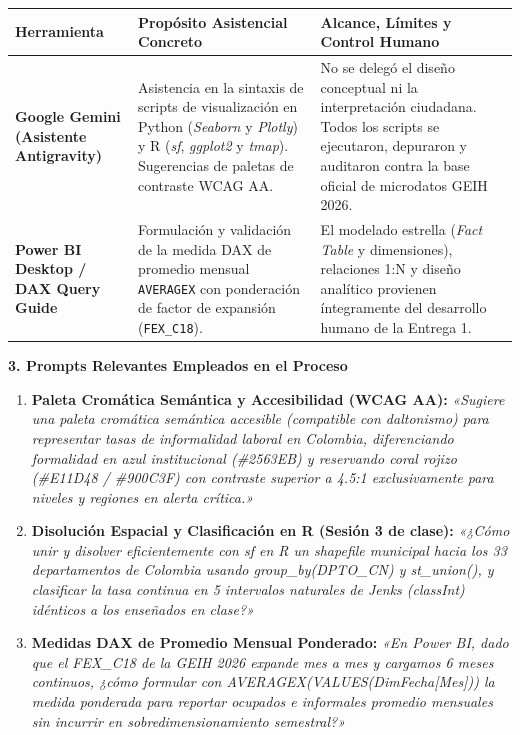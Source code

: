 \documentclass[10pt,letterpaper]{article}
\begin{document}
\bgroup
\def\arraystretch{1.15}
\fontsize{8pt}{10pt}\selectfont
\begin{tabularx}{\textwidth}{>{\bfseries\color{navy}}p{3.2cm} X X}
\toprule
\rowcolor{accentbg}
\textbf{Herramienta} & \textbf{Propósito Asistencial Concreto} & \textbf{Alcance, Límites y Control Humano} \\
\midrule
Google Gemini \newline (Asistente Antigravity) & 
Asistencia en la sintaxis de scripts de visualización en Python (\textit{Seaborn} y \textit{Plotly}) y R (\textit{sf}, \textit{ggplot2} y \textit{tmap}). Sugerencias de paletas de contraste WCAG AA. & 
No se delegó el diseño conceptual ni la interpretación ciudadana. Todos los scripts se ejecutaron, depuraron y auditaron contra la base oficial de microdatos GEIH 2026. \\
\midrule
Power BI Desktop / \newline DAX Query Guide & 
Formulación y validación de la medida DAX de promedio mensual \texttt{AVERAGEX} con ponderación de factor de expansión (\texttt{FEX\_C18}). & 
El modelado estrella (\textit{Fact Table} y dimensiones), relaciones 1:N y diseño analítico provienen íntegramente del desarrollo humano de la Entrega 1. \\
\bottomrule
\end{tabularx}
\egroup

\vspace{3pt}

{\color{navy}\fontsize{10pt}{12pt}\selectfont \textbf{3. Prompts Relevantes Empleados en el Proceso}}
\vspace{1pt}

\begin{enumerate}[label=\textbf{\arabic*.},leftmargin=12pt,itemsep=1pt,topsep=1pt]
  \itemsep 1pt
  \item {\fontsize{8pt}{10pt}\selectfont \textbf{Paleta Cromática Semántica y Accesibilidad (WCAG AA):} \textit{«Sugiere una paleta cromática semántica accesible (compatible con daltonismo) para representar tasas de informalidad laboral en Colombia, diferenciando formalidad en azul institucional (\#2563EB) y reservando coral rojizo (\#E11D48 / \#900C3F) con contraste superior a 4.5:1 exclusivamente para niveles y regiones en alerta crítica.»}}
  \item {\fontsize{8pt}{10pt}\selectfont \textbf{Disolución Espacial y Clasificación en R (Sesión 3 de clase):} \textit{«¿Cómo unir y disolver eficientemente con sf en R un shapefile municipal hacia los 33 departamentos de Colombia usando group\_by(DPTO\_CN) y st\_union(), y clasificar la tasa continua en 5 intervalos naturales de Jenks (classInt) idénticos a los enseñados en clase?»}}
  \item {\fontsize{8pt}{10pt}\selectfont \textbf{Medidas DAX de Promedio Mensual Ponderado:} \textit{«En Power BI, dado que el FEX\_C18 de la GEIH 2026 expande mes a mes y cargamos 6 meses continuos, ¿cómo formular con AVERAGEX(VALUES(DimFecha[Mes])) la medida ponderada para reportar ocupados e informales promedio mensuales sin incurrir en sobredimensionamiento semestral?»}}
\end{enumerate}
\end{document}
